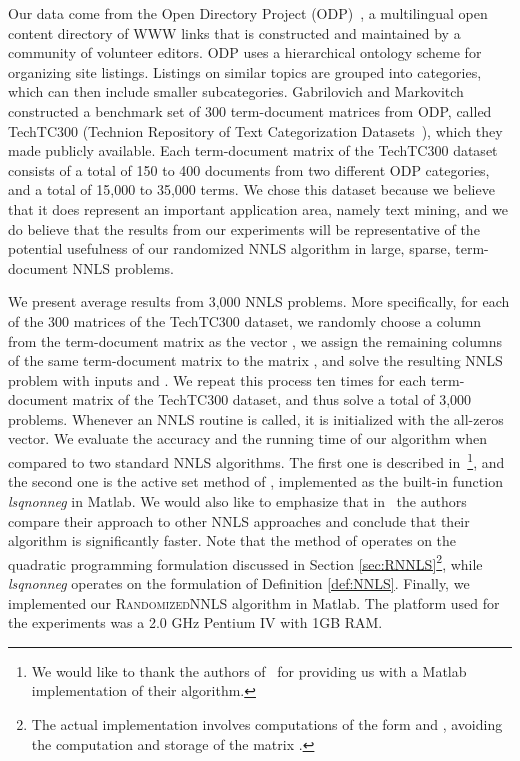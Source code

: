 \documentclass[11pt]{article}
\begin{document}
Our data come from the Open Directory Project (ODP)~\cite{odp}, a
multilingual open content directory of WWW links that is
constructed and maintained by a community of volunteer editors.
ODP uses a hierarchical ontology scheme for organizing site
listings. Listings on similar topics are grouped into categories,
which can then include smaller subcategories. Gabrilovich and
Markovitch constructed a benchmark set of 300 term-document
matrices from ODP, called TechTC300 (Technion Repository of Text
Categorization Datasets~\cite{GM04}), which they made publicly
available. Each term-document matrix of the TechTC300 dataset
consists of a total of 150 to 400 documents from two different ODP
categories, and a total of 15,000 to 35,000 terms. We chose this
dataset because we believe that it does represent an important
application area, namely text mining, and we do believe that the
results from our experiments will be representative of the
potential usefulness of our randomized NNLS algorithm in large,
sparse, term-document NNLS problems.

We present average results from 3,000 NNLS problems. More
specifically, for each of the 300 matrices of the TechTC300
dataset, we randomly choose a column from the term-document matrix
as the vector , we assign the remaining columns of the same
term-document matrix to the matrix , and solve the resulting
NNLS problem with inputs  and . We repeat this process ten
times for each term-document matrix of the TechTC300 dataset, and
thus solve a total of 3,000 problems. Whenever an NNLS routine is
called, it is initialized with the all-zeros vector. We evaluate
the accuracy and the running time of our algorithm when compared
to two standard NNLS algorithms. The first one is described
in~\cite{KSD07}\footnote{We would like to thank the authors
of~\cite{KSD07} for providing us with a Matlab
implementation of their algorithm.}, and the second
one is the active set method of \cite{LH74}, implemented as the
built-in function \emph{lsqnonneg} in Matlab. We would also like
to emphasize that in~\cite{KSD07} the authors compare their
approach to other NNLS approaches and conclude that their
algorithm is significantly faster. Note that the method of
\cite{KSD07} operates on the quadratic programming formulation
discussed in Section \ref{sec:RNNLS}\footnote{The actual
implementation involves computations of the form  and
, avoiding the computation and storage of the matrix
.}, while \emph{lsqnonneg} operates on the formulation of
Definition \ref{def:NNLS}. Finally, we implemented our
\textsc{RandomizedNNLS} algorithm in Matlab. The platform used for
the experiments was a 2.0 GHz Pentium IV with 1GB RAM.
\end{document}
